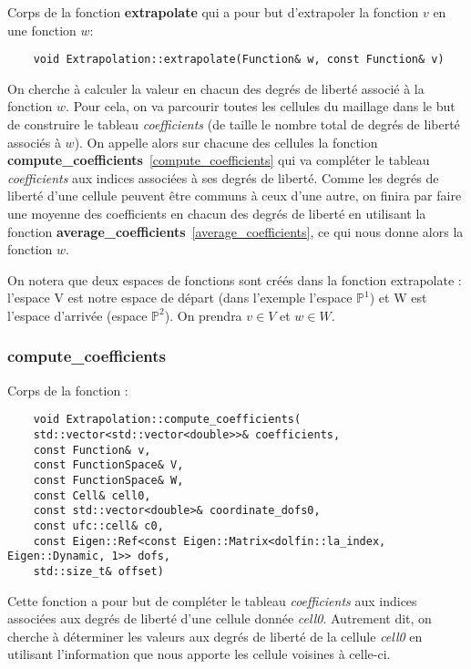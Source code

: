 Corps de la fonction \textbf{extrapolate} qui a pour but d'extrapoler la fonction $v$ en une fonction $w$:

\begin{lstlisting}
	void Extrapolation::extrapolate(Function& w, const Function& v)
\end{lstlisting}

On cherche à calculer la valeur en chacun des degrés de liberté associé à la fonction $w$. Pour cela, on va parcourir toutes les cellules du maillage dans le but de construire le tableau \textit{coefficients} (de taille le nombre total de degrés de liberté associés à $w$). On appelle alors sur chacune des cellules la fonction \textbf{compute\_coefficients}~\ref{compute_coefficients} qui va compléter le tableau \textit{coefficients} aux indices associées à ses degrés de liberté. Comme les degrés de liberté d'une cellule peuvent être communs à ceux d'une autre, on finira par faire une moyenne des coefficients en chacun des degrés de liberté en utilisant la fonction \textbf{average\_coefficients}~\ref{average_coefficients}, ce qui nous donne alors la fonction $w$. 

On notera que deux espaces de fonctions sont créés dans la fonction extrapolate : l'espace V est notre espace de départ (dans l'exemple l'espace $\mathbb{P}^1$) et W est l'espace d'arrivée (espace $\mathbb{P}^2$). On prendra $v\in V$ et $w\in W$.

\subsubsection*{compute\_coefficients}
\label{compute_coefficients}

Corps de la fonction :

\begin{lstlisting}
	void Extrapolation::compute_coefficients(
	std::vector<std::vector<double>>& coefficients,
	const Function& v,
	const FunctionSpace& V,
	const FunctionSpace& W,
	const Cell& cell0,
	const std::vector<double>& coordinate_dofs0,
	const ufc::cell& c0,
	const Eigen::Ref<const Eigen::Matrix<dolfin::la_index, Eigen::Dynamic, 1>> dofs,
	std::size_t& offset)
\end{lstlisting}

Cette fonction a pour but de compléter le tableau \textit{coefficients} aux indices associées aux degrés de liberté d'une cellule donnée \textit{cell0}. Autrement dit, on cherche à déterminer les valeurs aux degrés de liberté de la cellule \textit{cell0} en utilisant l'information que nous apporte les cellule voisines à celle-ci.\\

